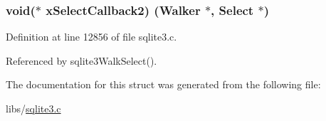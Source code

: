 \subsubsection[{x\+Select\+Callback2}]{\setlength{\rightskip}{0pt plus 5cm}void($\ast$ x\+Select\+Callback2) ({\bf Walker} $\ast$, {\bf Select} $\ast$)}\label{struct_walker_af47ca3398892c8e1b77ecfec55854383}


Definition at line 12856 of file sqlite3.\+c.



Referenced by sqlite3\+Walk\+Select().



The documentation for this struct was generated from the following file\+:\begin{DoxyCompactItemize}
\item 
libs/\hyperlink{sqlite3_8c}{sqlite3.\+c}\end{DoxyCompactItemize}
